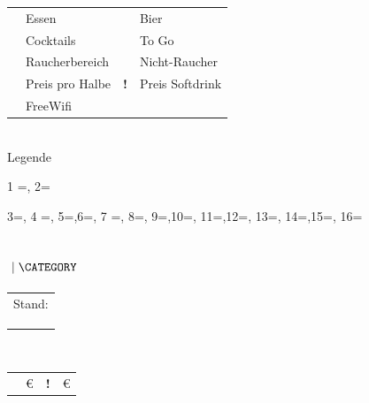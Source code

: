 \begin{center}
	\noindent
	\begin{tabular}{cl|cl}
		\faUtensils     & Essen          & \faBeer           & Bier     \\
		\faCocktail     & Cocktails      & \faShoppingBag    & To Go      \\
		\faSmoking      & Raucherbereich & \faSmokingBan     & Nicht-Raucher \\
		\faBeer\faEuroSign               & Preis pro Halbe   & 
		\textbf{!}\faBeer\faEuroSign     & Preis Softdrink\\
		\faWifi           & FreeWifi     &&\\
	\end{tabular}\\
	Legende
\end{center}

\csvreader[separator=pipe,respect all]{\kneipenCSV}
{1 =\name, 2=\address,  3=\beerprice,
	4 =\softdrinkprice,    5=\web ,6=\phone,
	7 =\food, 8=\beer,     9=\wifi,10=\cocktails,
	11=\togo,12=\smoking,  13=\smokingBan,
	14=\desc,15=\category, 16=\update
}{
	\vspace{-1.65em}
	\noindent
	\subsection*{\name \small{$~\mid \MakeUppercase\category$}}
	\vspace{-1.45em}
	\begin{minipage}{0.6\textwidth}
		\begin{tabular}{cl}
			\multicolumn{2}{l}{Stand: \update} \\
			\faMapMarker & \is{\address} \\
			\faPhone     & \is{\phone}   \\
			\faLaptop    & \isUrl{\web}
		\end{tabular}
	\end{minipage}
	\hfill
	\begin{minipage}{0.4\textwidth}
		\vspace{-1.25em}
		\features{\has{\food}}{\has{\beer}}{\has{\cocktails}}{\has{\wifi}}
		{\has{\togo}}{\has{\smoking}}{\has{\smokingBan}}\\[0.5em]
		\begin{tabular}{rlll}
			\faBeer\faEuroSign               & \beerprice\euro         %
			  & \textbf{!}\faBeer\faEuroSign & \softdrinkprice\euro \\ %
		\end{tabular}
	\end{minipage}\\[.5em]
	\desc\\
}
